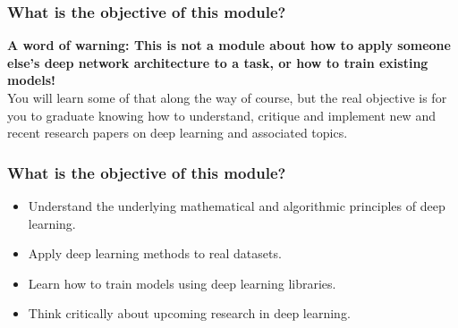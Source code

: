\documentclass[]{article}
\begin{document}
\begin{frame}
	\frametitle{What is the objective of this module?}

	\textbf{A word of warning: This is not a module about how to apply someone else's deep network architecture to a task, or how to train existing models!}
	\\[1em]
	You will learn some of that along the way of course, but the real objective is for you to graduate knowing how to understand, critique and implement new and recent research papers on deep learning and associated topics.
\end{frame}

\begin{frame}
	\frametitle{What is the objective of this module?}
	\begin{itemize}
		\item<+-> Understand the underlying mathematical and algorithmic principles of deep learning.
		\item<+-> Apply deep learning methods to real datasets.
		\item<+-> Learn how to train models using deep learning libraries.
		\item<+-> Think critically about upcoming research in deep learning.
		
	\end{itemize}
\end{frame}
\end{document}
